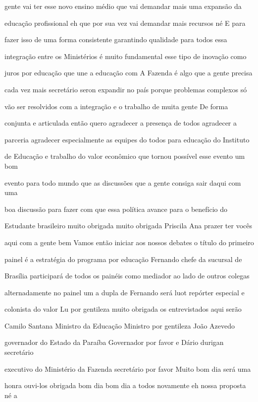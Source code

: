 \documentclass[a4paper,12pt]{article}
\begin{document}
gente vai ter esse novo ensino médio que vai demandar mais uma expansão da

educação profissional eh que por sua vez vai demandar mais recursos né E para

fazer isso de uma forma consistente garantindo qualidade para todos essa

integração entre os Ministérios é muito fundamental esse tipo de inovação como

juros por educação que une a educação com A Fazenda é algo que a gente precisa

cada vez mais secretário seron expandir no país porque problemas complexos só

vão ser resolvidos com a integração e o trabalho de muita gente De forma

conjunta e articulada então quero agradecer a presença de todos agradecer a

parceria agradecer especialmente as equipes do todos para educação do Instituto

de Educação e trabalho do valor econômico que tornou possível esse evento um bom

evento para todo mundo que as discussões que a gente consiga sair daqui com uma

boa discussão para fazer com que essa política avance para o benefício do

Estudante brasileiro muito obrigada muito obrigada Priscila Ana prazer ter vocês

aqui com a gente bem Vamos então iniciar aos nossos debates o título do primeiro

painel é a estratégia do programa por educação Fernando chefe da sucursal de

Brasília participará de todos os painéis como mediador ao lado de outros colegas

alternadamente no painel um a dupla de Fernando será luot repórter especial e

colonista do valor Lu por gentileza muito obrigada os entrevistados aqui serão

Camilo Santana Ministro da Educação Ministro por gentileza João Azevedo

governador do Estado da Paraíba Governador por favor e Dário durigan secretário

executivo do Ministério da Fazenda secretário por favor Muito bom dia será uma

honra ouvi-los obrigada bom dia bom dia a todos novamente eh nossa proposta né a
\end{document}
